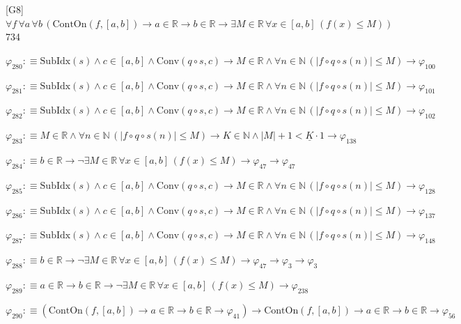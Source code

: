 \begin{fullproof}{[G8]}{$\forall f\,\forall a\,\forall b\,(\mathrm{ContOn}(f,[a,b]) \to a \in \mathbb{R} \to b \in \mathbb{R} \to \exists M \in \mathbb{R}\,\forall x \in [a,b]\,(f(x) \leq M))$}{734}
\begin{abbrevlist}
\item $\varphi_{280} :\equiv \mathrm{SubIdx}(s) \land c \in [a,b] \land \mathrm{Conv}(q \circ s,c) \to M \in \mathbb{R} \land \forall n \in \mathbb{N}\,(\lvert f \circ q \circ s(n) \rvert \leq M) \to \varphi_{100}$
\item $\varphi_{281} :\equiv \mathrm{SubIdx}(s) \land c \in [a,b] \land \mathrm{Conv}(q \circ s,c) \to M \in \mathbb{R} \land \forall n \in \mathbb{N}\,(\lvert f \circ q \circ s(n) \rvert \leq M) \to \varphi_{101}$
\item $\varphi_{282} :\equiv \mathrm{SubIdx}(s) \land c \in [a,b] \land \mathrm{Conv}(q \circ s,c) \to M \in \mathbb{R} \land \forall n \in \mathbb{N}\,(\lvert f \circ q \circ s(n) \rvert \leq M) \to \varphi_{102}$
\item $\varphi_{283} :\equiv M \in \mathbb{R} \land \forall n \in \mathbb{N}\,(\lvert f \circ q \circ s(n) \rvert \leq M) \to K \in \mathbb{N} \land \lvert M \rvert + 1 < \underline{K} \cdot 1 \to \varphi_{138}$
\item $\varphi_{284} :\equiv b \in \mathbb{R} \to \neg \exists M \in \mathbb{R}\,\forall x \in [a,b]\,(f(x) \leq M) \to \varphi_{47} \to \varphi_{47}$
\item $\varphi_{285} :\equiv \mathrm{SubIdx}(s) \land c \in [a,b] \land \mathrm{Conv}(q \circ s,c) \to M \in \mathbb{R} \land \forall n \in \mathbb{N}\,(\lvert f \circ q \circ s(n) \rvert \leq M) \to \varphi_{128}$
\item $\varphi_{286} :\equiv \mathrm{SubIdx}(s) \land c \in [a,b] \land \mathrm{Conv}(q \circ s,c) \to M \in \mathbb{R} \land \forall n \in \mathbb{N}\,(\lvert f \circ q \circ s(n) \rvert \leq M) \to \varphi_{137}$
\item $\varphi_{287} :\equiv \mathrm{SubIdx}(s) \land c \in [a,b] \land \mathrm{Conv}(q \circ s,c) \to M \in \mathbb{R} \land \forall n \in \mathbb{N}\,(\lvert f \circ q \circ s(n) \rvert \leq M) \to \varphi_{148}$
\item $\varphi_{288} :\equiv b \in \mathbb{R} \to \neg \exists M \in \mathbb{R}\,\forall x \in [a,b]\,(f(x) \leq M) \to \varphi_{47} \to \varphi_{3} \to \varphi_{3}$
\item $\varphi_{289} :\equiv a \in \mathbb{R} \to b \in \mathbb{R} \to \neg \exists M \in \mathbb{R}\,\forall x \in [a,b]\,(f(x) \leq M) \to \varphi_{238}$
\item $\varphi_{290} :\equiv (\mathrm{ContOn}(f,[a,b]) \to a \in \mathbb{R} \to b \in \mathbb{R} \to \varphi_{41}) \to \mathrm{ContOn}(f,[a,b]) \to a \in \mathbb{R} \to b \in \mathbb{R} \to \varphi_{56}$

\end{abbrevlist}
\end{fullproof}

